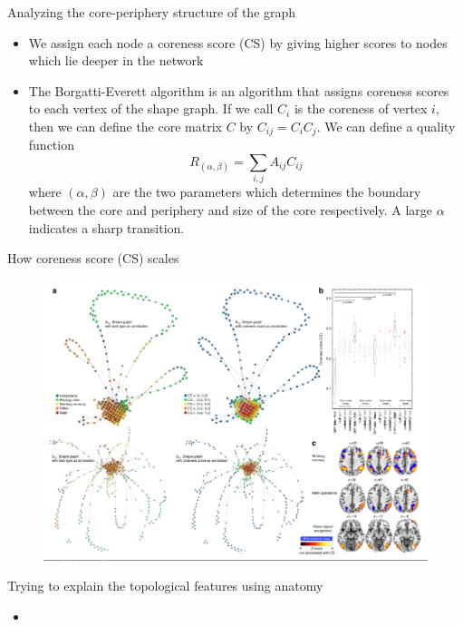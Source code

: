 \documentclass{beamer}
\begin{document}
\begin{frame}{Analyzing the core-periphery structure of the graph}
    \begin{itemize}
        \item We assign each node a coreness score (CS) by giving higher scores to nodes which lie deeper in the network
        \item The Borgatti-Everett algorithm is an algorithm that assigns coreness scores to each vertex of the shape graph. If we call $C_i$ is the coreness of vertex $i$, then we can define the core matrix $C$ by $C_{ij} = C_{i}C_j$. We can define a quality function \[R_{(\alpha,\beta)} = \sum_{i,j}A_{ij}C_{ij}\]where $(\alpha, \beta)$ are the two parameters which determines the boundary between the core and periphery and size of the core respectively. A large $\alpha$ indicates a sharp transition. 
    \end{itemize}
\end{frame}

\begin{frame}{How coreness score (CS) scales}
    \begin{figure}
        \includegraphics[width = 0.85\linewidth]{fig4.png}
    \end{figure}
\end{frame}

\begin{frame}{Trying to explain the topological features using anatomy}
    \begin{itemize}
        \item 
    \end{itemize}
\end{frame}
\end{document}
